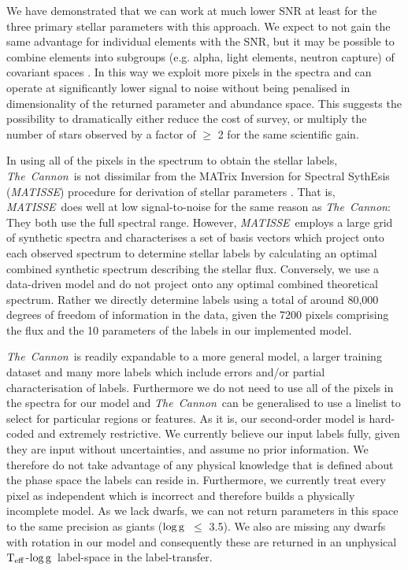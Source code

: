 \documentclass[12pt, preprint]{aastex}
\newcommand{\teff}{\mbox{$\rm T_{eff}$}}
\newcommand{\logg}{\mbox{$\rm \log g$}}
\newcommand{\tc}{\textsl{The~Cannon}}
\newcommand{\matisse}{\textsl{MATISSE}}
\begin{document}
We have demonstrated that we can work at much lower SNR at least for the three primary stellar parameters with this approach. 
We expect to not gain the same advantage for individual elements with the SNR, but it may be possible to combine elements into subgroups (e.g. alpha, light elements, neutron capture) of covariant spaces \citep[e.g.][]{Ting2012}. In this way we exploit more pixels in the spectra and can operate at significantly lower signal to noise without being penalised in dimensionality of the returned parameter and abundance space. 
This suggests the possibility to dramatically either reduce the cost of survey, or multiply the number of stars observed by a factor of $\ge$ 2 for the same scientific gain. 

In using all of the pixels in the spectrum to obtain the
stellar labels, \tc\ is not dissimilar from the MATrix Inversion for
Spectral SythEsis (\matisse) procedure for derivation of stellar
parameters \citep{RB2006}.
That is, \matisse\ does well at low signal-to-noise for the same
reason as \tc:  They both use the full spectral range.
However, \matisse\ employs a large grid of synthetic spectra and
characterises a set of basis vectors which project onto each observed
spectrum to determine stellar labels by calculating an optimal
combined synthetic spectrum describing the stellar flux.
Conversely, we use a data-driven model and do not project onto any
optimal combined theoretical spectrum.
Rather we directly determine labels using a total of around 80,000
degrees of freedom of information in the data, given the 7200 pixels
comprising the flux and the 10 parameters of the labels in our
implemented model.


 \tc\ is readily expandable to a more general model, a larger training dataset and many more labels which include errors and/or partial characterisation of labels. Furthermore we do not need to use all of the pixels in the spectra for our model and \tc\ can be generalised to use a linelist to select for particular regions or features.
 As it is, our second-order model is hard-coded and extremely restrictive. 
 We currently believe our input labels fully, given they are input without uncertainties, and assume no prior information. 
 We therefore do not take advantage of any physical knowledge that is defined about the phase space the labels can reside in.  
 Furthermore, we currently treat every pixel as independent which is incorrect and therefore builds a physically incomplete model.  As we lack dwarfs, we can not return parameters in this space to the same precision as giants (\logg\ $\le$ 3.5).  
 We also are missing any dwarfs with rotation in our model and consequently these are returned in an unphysical \teff-\logg\ label-space in the label-transfer. 
\end{document}
